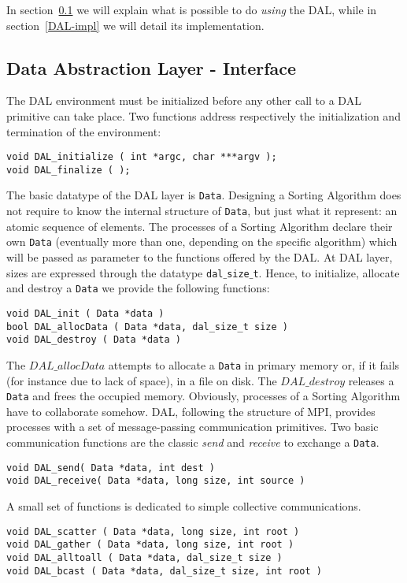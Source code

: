 In section~\ref{DAL-int} we will explain what is possible to do \textit{using} the DAL, while in section~\ref{DAL-impl} we will detail its implementation. 

\subsection{Data Abstraction Layer - Interface}
\label{DAL-int}
The DAL environment must be initialized before any other call to a DAL primitive can take place. Two functions address respectively the initialization and termination of the environment:
\begin{lstlisting}
void DAL_initialize ( int *argc, char ***argv );
void DAL_finalize ( );
\end{lstlisting}
The basic datatype of the DAL layer is \texttt{Data}. Designing a Sorting Algorithm does not require to know the internal structure of \texttt{Data}, but just what it represent: an atomic sequence of elements. The processes of a Sorting Algorithm declare their own \texttt{Data} (eventually more than one, depending on the specific algorithm) which will be passed as parameter to the functions offered by the DAL. At DAL layer, sizes are expressed through the datatype \texttt{dal$\_$size$\_$t}. Hence, to initialize, allocate and destroy a \texttt{Data} we provide the following functions:
\begin{lstlisting}
void DAL_init ( Data *data )
bool DAL_allocData ( Data *data, dal_size_t size )
void DAL_destroy ( Data *data )
\end{lstlisting}
The $DAL\_allocData$ attempts to allocate a \texttt{Data} in primary memory or, if it fails (for instance due to lack of space), in a file on disk. The $DAL\_destroy$ releases a \texttt{Data} and frees the occupied memory. 
Obviously, processes of a Sorting Algorithm have to collaborate somehow. DAL, following the structure of MPI, provides processes with a set of message-passing communication primitives. Two basic communication functions are the classic \textit{send} and \textit{receive} to exchange a \texttt{Data}.
\begin{lstlisting}
void DAL_send( Data *data, int dest )
void DAL_receive( Data *data, long size, int source )
\end{lstlisting}
A small set of functions is dedicated to simple collective communications.
\begin{lstlisting}
void DAL_scatter ( Data *data, long size, int root )
void DAL_gather ( Data *data, long size, int root )
void DAL_alltoall ( Data *data, dal_size_t size )
void DAL_bcast ( Data *data, dal_size_t size, int root )
\end{lstlisting}
